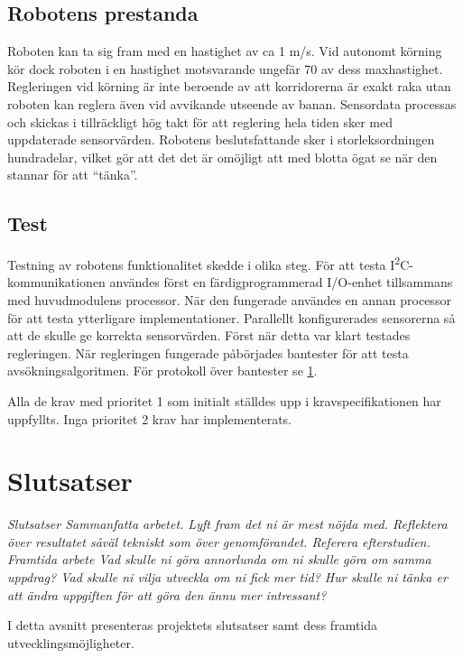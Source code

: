 \documentclass[11pt]{article}
\begin{document}
\begin{flushleft}
\subsection{Robotens prestanda}
Roboten kan ta sig fram med en hastighet av ca 1 m/s. Vid autonomt körning kör dock roboten i en hastighet motsvarande ungefär 70 av dess maxhastighet. Regleringen vid körning är inte beroende av att korridorerna är exakt raka utan roboten kan reglera även vid avvikande utseende av banan. Sensordata processas och skickas i tillräckligt hög takt för att reglering hela tiden sker med uppdaterade sensorvärden. Robotens beslutsfattande sker i storleksordningen hundradelar, vilket gör att det det är omöjligt att med blotta ögat se när den stannar för att ``tänka''. %

\subsection{Test}
Testning av robotens funktionalitet skedde i olika steg. För att testa I\textsuperscript{2}C-kommunikationen användes först en färdigprogrammerad I/O-enhet tillsammans med huvudmodulens processor. När den fungerade användes en annan processor för att testa ytterligare implementationer. Parallellt konfigurerades sensorerna så att de skulle ge korrekta sensorvärden. Först när detta var klart testades regleringen. När regleringen fungerade påbörjades bantester för att testa avsökningsalgoritmen. För protokoll över bantester se \ref{}. 

Alla de krav med prioritet 1 som initialt ställdes upp i kravspecifikationen har uppfyllts. Inga prioritet 2 krav har implementerats.

\pagebreak

\section{Slutsatser}
\textit{Slutsatser
Sammanfatta arbetet. 
Lyft fram det ni är mest nöjda med.
Reflektera över resultatet såväl tekniskt som över genomförandet. Referera efterstudien.}
\textit{Framtida arbete
Vad skulle ni göra annorlunda om ni skulle göra om samma uppdrag?
Vad skulle ni vilja utveckla om ni fick mer tid?
Hur skulle ni tänka er att ändra uppgiften för att göra den ännu mer intressant?}

I detta avsnitt presenteras projektets slutsatser samt dess framtida utvecklingsmöjligheter.


\end{flushleft}
\end{document}
